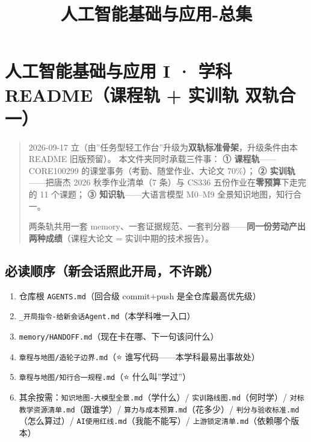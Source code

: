 \documentclass[
  chinese,
  11pt,
]{ctexart}
\title{人工智能基础与应用-总集}
\author{}
\date{}
\providecommand{\tightlist}{%
  \setlength{\itemsep}{0pt}\setlength{\parskip}{0pt}}
\begin{document}
\maketitle

{
\setcounter{tocdepth}{2}
\tableofcontents
}
\section{人工智能基础与应用 I · 学科 README（课程轨 + 实训轨 双轨合一）}\label{ux4ebaux5de5ux667aux80fdux57faux7840ux4e0eux5e94ux7528-i-ux5b66ux79d1-readmeux8bfeux7a0bux8f68-ux5b9eux8badux8f68-ux53ccux8f68ux5408ux4e00}

\begin{quote}
2026-09-17 立（由''任务型轻工作台''升级为\textbf{双轨标准骨架}，升级条件由本 README 旧版预留）。 本文件夹同时承载三件事： \textbf{① 课程轨}------CORE100299 的课堂事务（考勤、随堂作业、大论文 70\%）； \textbf{② 实训轨}------把唐杰 2026 秋季作业清单（7 条）与 CS336 五份作业在\textbf{零预算}下走完的 11 个课题； \textbf{③ 知识轨}------大语言模型 M0--M9 全景知识地图，知行合一。

两条轨共用一套 memory、一套证据规范、一套判分器------\textbf{同一份劳动产出两种成绩}（课程大论文 = 实训中期的技术报告）。
\end{quote}

\subsection{必读顺序（新会话照此开局，不许跳）}\label{ux5fc5ux8bfbux987aux5e8fux65b0ux4f1aux8bddux7167ux6b64ux5f00ux5c40ux4e0dux8bb8ux8df3}

\begin{enumerate}
\def\labelenumi{\arabic{enumi}.}
\tightlist
\item
  仓库根 \texttt{AGENTS.md}（回合级 commit+push 是全仓库最高优先级）
\item
  \texttt{\_开局指令-给新会话Agent.md}（本学科唯一入口）
\item
  \texttt{memory/HANDOFF.md}（现在卡在哪、下一句该问什么）
\item
  \texttt{章程与地图/造轮子边界.md}（⭐ 谁写代码------本学科最易出事故处）
\item
  \texttt{章程与地图/知行合一规程.md}（⭐ 什么叫''学过''）
\item
  其余按需：\texttt{知识地图-大模型全景.md}（学什么）/ \texttt{实训路线图.md}（何时学）/ \texttt{对标教学资源清单.md}（跟谁学）/ \texttt{算力与成本预算.md}（花多少）/ \texttt{判分与验收标准.md}（怎么算过）/ \texttt{AI使用红线.md}（我能不能写）/ \texttt{上游锁定清单.md}（依赖哪个版本）
\end{enumerate}
\end{document}
